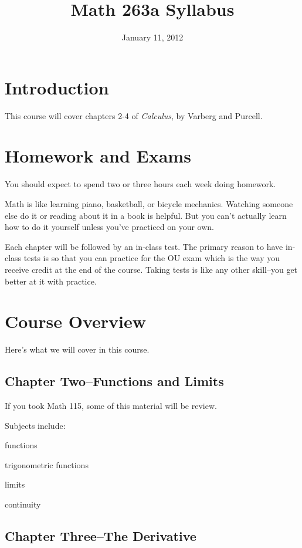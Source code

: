 \documentclass[fleqn, onecolumn]{article}
\title{Math 263a Syllabus}
\date{January 11, 2012}
\begin{document}
\maketitle

\section{Introduction}
This course will cover chapters 2-4 of {\em Calculus}, by Varberg and Purcell.

\section{Homework and Exams}

You should expect to spend two or three hours each week doing homework.

Math is like learning piano, basketball, or bicycle mechanics.  Watching someone else do it or reading about it in a
book is helpful.  But you can't actually learn how to do it yourself unless you've practiced on your own.

Each chapter will be followed by an in-class test.  The primary reason to have in-class tests is so that you can
practice for the OU exam which is the way you receive credit at the end of the course.  Taking tests is like any other
skill--you get better at it with practice.

\section{Course Overview}

Here's what we will cover in this course. 

\subsection{Chapter Two--Functions and Limits}
If you took Math 115, some of this material will be review.

Subjects include:
\begin{itemize*}
\item functions
\item trigonometric functions
\item limits
\item continuity
\end{itemize*}

\subsection{Chapter Three--The Derivative}
\end{document}
